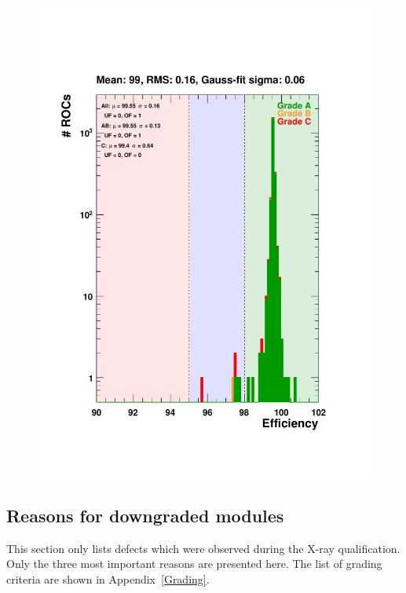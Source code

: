 \documentclass[a4paper,12pt,twoside]{article}
\begin{document}
\begin{itemize}
\begin{figure} [h!]
\begin{minipage}{.48\textwidth}
  \includegraphics[width=\textwidth]{./Figures/Efficiency300.pdf}
  \label{Efficiency300}
\end{minipage}
\end{figure}
\end{itemize}

\subsection{Reasons for downgraded modules}
This section only lists defects which were observed during the X-ray qualification. Only the three most important reasons are presented here. The list of grading criteria are shown in Appendix~\ref{Grading}.
\end{document}
